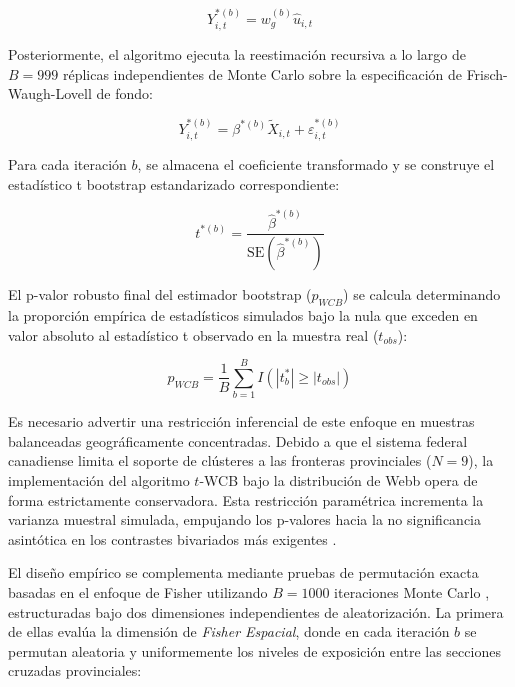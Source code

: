\begin{equation}
    Y_{i,t}^{*(b)} = w_g^{(b)} \hat{u}_{i,t}
\end{equation}

Posteriormente, el algoritmo ejecuta la reestimaci\'on recursiva a lo largo de $B = 999$ r\'eplicas independientes de Monte Carlo sobre la especificaci\'on de Frisch-Waugh-Lovell de fondo:

\begin{equation}
    Y_{i,t}^{*(b)} = \beta^{*(b)} \tilde{X}_{i,t} + \varepsilon_{i,t}^{*(b)}
\end{equation}

Para cada iteraci\'on $b$, se almacena el coeficiente transformado y se construye el estad\'istico t bootstrap estandarizado correspondiente:

\begin{equation}
    t^{*(b)} = \frac{\hat{\beta}^{*(b)}}{\text{SE}(\hat{\beta}^{*(b)})}
\end{equation}

El p-valor robusto final del estimador bootstrap ($p_{WCB}$) se calcula determinando la proporci\'on emp\'irica de estad\'isticos simulados bajo la nula que exceden en valor absoluto al estad\'istico t observado en la muestra real ($t_{obs}$):

\begin{equation}
    p_{WCB} = \frac{1}{B} \sum_{b=1}^{B} \textit{$I$} \left( \left| t_b^* \right| \ge \left| t_{obs} \right| \right)
    \label{eq:p_wcb_final}
\end{equation}

Es necesario advertir una restricci\'on inferencial de este enfoque en muestras balanceadas geogr\'aficamente concentradas. Debido a que el sistema federal canadiense limita el soporte de cl\'usteres a las fronteras provinciales ($N=9$), la implementaci\'on del algoritmo $t$-WCB bajo la distribuci\'on de Webb opera de forma estrictamente conservadora. Esta restricci\'on param\'etrica incrementa la varianza muestral simulada, empujando los p-valores hacia la no significancia asint\'otica en los contrastes bivariados m\'as exigentes \citep{mackinnon2017wild, roodman2019fast}.

El dise\~no emp\'irico se complementa mediante pruebas de permutaci\'on exacta basadas en el enfoque de Fisher utilizando $B = 1000$ iteraciones Monte Carlo \citep{fisher1966design, young2022consistency}, estructuradas bajo dos dimensiones independientes de aleatorizaci\'on. La primera de ellas eval\'ua la dimensi\'on de \textit{Fisher Espacial}, donde en cada iteraci\'on $b$ se permutan aleatoria y uniformemente los niveles de exposici\'on entre las secciones cruzadas provinciales:

